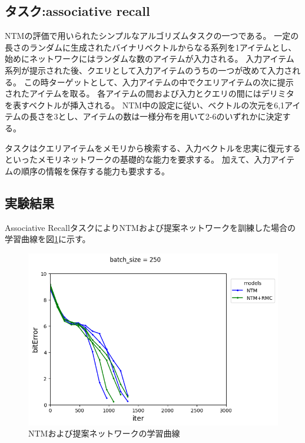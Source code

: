 
\subsection{タスク:associative recall}
NTM\cite{ntm}の評価で用いられたシンプルなアルゴリズムタスクの一つである。
一定の長さのランダムに生成されたバイナリベクトルからなる系列を1アイテムとし、
始めにネットワークにはランダムな数のアイテムが入力される。
入力アイテム系列が提示された後、クエリとして入力アイテムのうちの一つが改めて入力される。
この時ターゲットとして、入力アイテムの中でクエリアイテムの次に提示されたアイテムを取る。
各アイテムの間および入力とクエリの間にはデリミタを表すベクトルが挿入される。
NTM\cite{ntm}中の設定に従い、ベクトルの次元を6,1アイテムの長さを3とし、アイテムの数は一様分布を用いて2-6のいずれかに決定する。


タスクはクエリアイテムをメモリから検索する、入力ベクトルを忠実に復元するといったメモリネットワークの基礎的な能力を要求する。
加えて、入力アイテムの順序の情報を保存する能力も要求する。

\subsection{実験結果}
Associative RecallタスクによりNTMおよび提案ネットワークを訓練した場合の学習曲線を図\ref{fig:ntm,rmc_m12id3}に示す。
\begin{figure}[t]
	\centering
	\includegraphics[width=\linewidth]{./figure/associative/ntm,rmc_m12id3.png}
	\caption{NTMおよび提案ネットワークの学習曲線}
	\label{fig:ntm,rmc_m12id3}
\end{figure}

